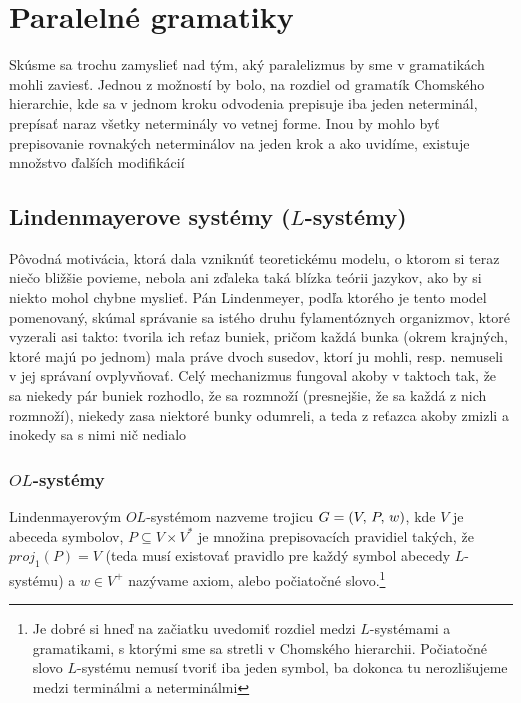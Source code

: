 \chapter{Paralelné gramatiky}

Skúsme sa trochu zamyslieť nad tým, aký paralelizmus by sme v
gramatikách mohli zaviesť. Jednou z možností by bolo, na rozdiel
od gramatík Chomského hierarchie, kde sa v jednom kroku odvodenia
prepisuje iba jeden neterminál, prepísať naraz všetky neterminály
vo vetnej forme. Inou by mohlo byť prepisovanie rovnakých
neterminálov na jeden krok a ako uvidíme, existuje množstvo
ďalších modifikácií

\section{Lindenmayerove systémy ($L$-systémy)}

\begin{motiv}
  Pôvodná motivácia, ktorá dala vzniknúť teoretickému modelu, o
  ktorom si teraz niečo bližšie povieme, nebola ani zďaleka taká
  blízka teórii jazykov, ako by si niekto mohol chybne myslieť. Pán
  Lindenmeyer, podľa ktorého je tento model pomenovaný, skúmal
  správanie sa istého druhu fylamentóznych organizmov, ktoré
  vyzerali asi takto: tvorila ich reťaz buniek, pričom každá bunka
  (okrem krajných, ktoré majú po jednom) mala práve dvoch susedov,
  ktorí ju mohli, resp. nemuseli v jej správaní ovplyvňovať. Celý
  mechanizmus fungoval akoby v taktoch tak, že sa niekedy pár buniek
  rozhodlo, že sa rozmnoží (presnejšie, že sa každá z nich
  rozmnoží), niekedy zasa niektoré bunky odumreli, a teda z reťazca
  akoby zmizli a inokedy sa s nimi nič nedialo
\end{motiv}

\subsection{$OL$-systémy}

\begin{definicia}[$OL$-systém]
  Lindenmayerovým $OL$-systémom nazveme
  trojicu $G = (V,\,P,\,w)$, kde $V$ je abeceda symbolov,
  $P \subseteq V \times V^{*}$ je množina prepisovacích
  pravidiel takých, že $proj_{1}(P) = V$ 
  (teda musí existovať pravidlo pre každý symbol abecedy $L$-systému)
  a $w \in V^{+}$ nazývame axiom, alebo
  počiatočné slovo.\footnote{
    Je dobré si hneď na začiatku uvedomiť
    rozdiel medzi $L$-systémami a gramatikami, s ktorými sme sa
    stretli v Chomského hierarchii. Počiatočné slovo
    $L$-systému nemusí tvoriť iba jeden symbol, ba dokonca tu
    nerozlišujeme medzi terminálmi a neterminálmi
  }
\end{definicia}

